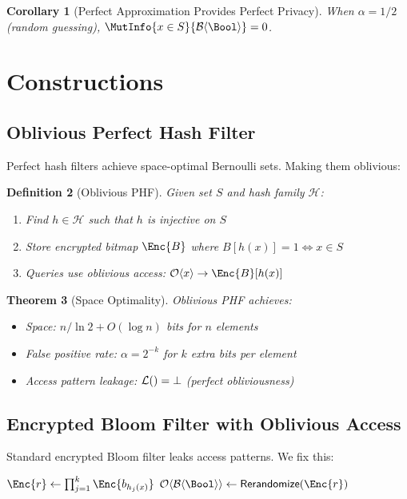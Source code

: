 \documentclass[11pt,final,hidelinks]{article}
\newcommand{\BernBool}{\mathcal{B}\langle \Bool \rangle}
\newcommand{\fprate}{\alpha}
\newtheorem{theorem}{Theorem}[section]
\newtheorem{corollary}[theorem]{Corollary}
\newtheorem{definition}[theorem]{Definition}
\begin{document}
\begin{corollary}[Perfect Approximation Provides Perfect Privacy]
When $\fprate = 1/2$ (random guessing), $\MutInfo{x \in S}{\BernBool} = 0$.
\end{corollary}

\section{Constructions}

\subsection{Oblivious Perfect Hash Filter}

Perfect hash filters achieve space-optimal Bernoulli sets. Making them oblivious:

\begin{definition}[Oblivious PHF]
Given set $S$ and hash family $\mathcal{H}$:
\begin{enumerate}
    \item Find $h \in \mathcal{H}$ such that $h$ is injective on $S$
    \item Store encrypted bitmap $\Enc{B}$ where $B[h(x)] = 1 \iff x \in S$
    \item Queries use oblivious access: $\ObvIn{x}{\Enc{B}[h(x)]}$
\end{enumerate}
\end{definition}

\begin{theorem}[Space Optimality]
Oblivious PHF achieves:
\begin{itemize}
    \item Space: $n/\ln 2 + O(\log n)$ bits for $n$ elements
    \item False positive rate: $\fprate = 2^{-k}$ for $k$ extra bits per element
    \item Access pattern leakage: $\mathcal{L}() = \bot$ (perfect obliviousness)
\end{itemize}
\end{theorem}

\subsection{Encrypted Bloom Filter with Oblivious Access}

Standard encrypted Bloom filter leaks access patterns. We fix this:

\begin{algorithm}[H]
\caption{Oblivious Encrypted Bloom Filter Query}
\KwOut{$\Obv{\BernBool}$}
$\Enc{r} \gets \prod_{j=1}^k \Enc{b_{h_j(x)}}$ 
$\Obv{\BernBool} \gets \mathsf{Rerandomize}(\Enc{r})$\;
\Return{$\Obv{\BernBool}$}
\end{algorithm}
\end{document}
